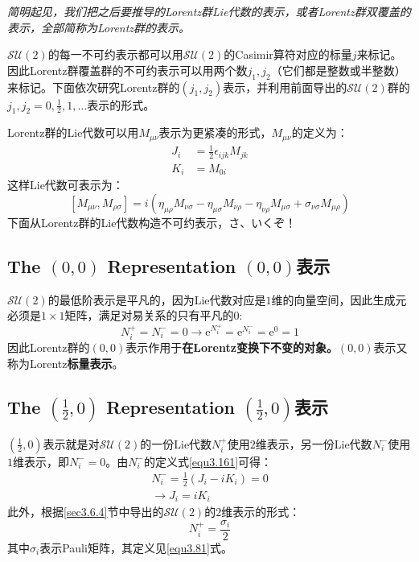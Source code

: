 {\it 简明起见，我们把之后要推导的Lorentz群Lie代数的表示，或者Lorentz群双覆盖的表示，全部简称为Lorentz群的表示。 }

$\mathcal{SU}(2)$的每一不可约表示都可以用$\mathcal{SU}(2)$的Casimir算符对应的标量$j$来标记。因此Lorentz群覆盖群的不可约表示可以用两个数$j_1, j_2$（它们都是整数或半整数）来标记。下面依次研究Lorentz群的$(j_1, j_2)$表示，并利用前面导出的$\mathcal{SU}(2)$群的$ j_1,j_2 = 0, \frac{1}{2}, 1, \dots$表示的形式。


Lorentz群的Lie代数可以用$M_{\mu \nu}$表示为更紧凑的形式，$M_{\mu \nu}$的定义为：
\begin{align}
\label{equ3.165}
	J_i &= \frac{1}{2} \epsilon_{ijk} M_{jk} \\
\label{equ3.166}
	K_i &= M_{0i}
\end{align}
这样Lie代数可表示为：
\begin{equation}
\label{equ3.167}
	[M_{\mu \nu}, M_{\rho \sigma}] = i(\eta_{\mu \rho} M_{\nu \sigma} - \eta_{\mu \sigma} M_{\nu \rho} - \eta_{\nu \rho} M_{\mu \sigma} + \sigma_{\nu \sigma} M_{\mu \rho})
\end{equation}
下面从Lorentz群的Lie代数构造不可约表示，さ、いくぞ！

\subsection[$(0, 0)$表示]{The $(0, 0)$ Representation \quad $(0, 0)$表示}
\label{sec3.7.4}
$\mathcal{SU}(2)$的最低阶表示是平凡的，因为Lie代数对应是$1$维的向量空间，因此生成元必须是$1 \times 1$矩阵，满足对易关系的只有平凡的$0$:
\begin{equation}
\label{equ3.168}
	N_i^+ = N_i^- = 0 \rightarrow \mathrm{e}^{N_i^+} = \mathrm{e}^{N_i^-} = \mathrm{e}^0 = 1
\end{equation}
因此Lorentz群的$(0, 0)$表示作用于{\bf 在Lorentz变换下不变的对象。$(0, 0)$}表示又称为Lorentz{\bf 标量表示}。


\subsection[$(\frac{1}{2}, 0)$表示]{The $(\frac{1}{2}, 0)$ Representation \quad $(\frac{1}{2}, 0)$表示}
\label{sec3.7.5}
$(\frac{1}{2}, 0)$表示就是对$\mathcal{SU}(2)$的一份Lie代数$N_i^+$使用$2$维表示，另一份Lie代数$N_i^-$使用$1$维表示，即$N_i^- = 0$。由$N_i^-$的定义式\ref{equ3.161}可得：
\begin{align}
\label{equ3.169}
	N_i^- = \frac{1}{2} (J_i - i K_i) = 0 \\
\label{equ3.170}
	\rightarrow J_i = i K_i
\end{align}
此外，根据\ref{sec3.6.4}节中导出的$\mathcal{SU}(2)$的$2$维表示的形式：
\begin{equation}
\label{equ3.171}
	N_i^+ = \frac{\sigma_i}{2}
\end{equation}
其中$\sigma_i$表示Pauli矩阵，其定义见\ref{equ3.81}式。

